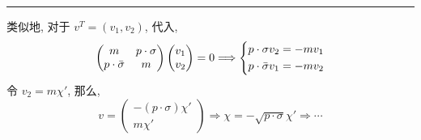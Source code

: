 \begin{itemize}
\begin{tcolorbox}[title=proof:]
		\noindent\rule[0.5ex]{\linewidth}{0.5pt} %
		
		类似地, 对于 $v^T = (v_1, v_2)$, 代入,
		\begin{equation}
			\begin{pmatrix}
				m & p \cdot \sigma \\
				p \cdot \bar{\sigma} & m
			\end{pmatrix} \begin{pmatrix}
				v_1 \\
				v_2
			\end{pmatrix} = 0 \Longrightarrow \begin{dcases}
				p \cdot \sigma v_2 = - m v_1 \\
				p \cdot \bar{\sigma} v_1 = - m v_2
			\end{dcases}
		\end{equation}
		令 $v_2 = m \chi'$, 那么,
		\begin{equation}
			v = \begin{pmatrix}
				- (p \cdot \sigma) \chi' \\
				m \chi'
			\end{pmatrix} \Longrightarrow \chi = - \sqrt{p \cdot \sigma} \chi' \Longrightarrow \cdots
		\end{equation}
	\end{tcolorbox}
	

\end{itemize}
